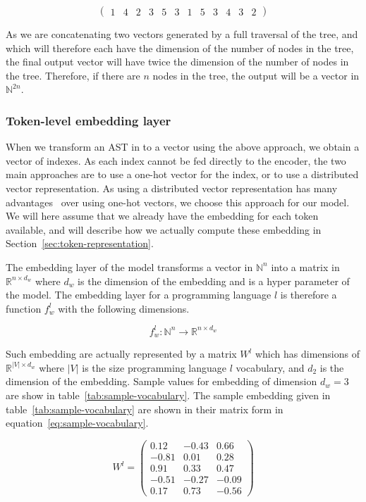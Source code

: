 \[ \begin{pmatrix}1 & 4 & 2 & 3 & 5 & 3 & 1 & 5 & 3 & 4 & 3 & 2\end{pmatrix} \]

As we are concatenating two vectors generated by a full traversal of the tree,
and which will therefore each have the dimension of the number of nodes in the
tree, the final output vector will have twice the dimension of the number of
nodes in the tree. Therefore, if there are $n$ nodes in the tree, the output
will be a vector in $\mathbb{N}^{2n}$.
%
\subsubsection{\label{sssec:token-embedding-layer} Token-level embedding layer}
When we transform an AST in to a vector using the above approach, we obtain a
vector of indexes. As each index cannot be fed directly to the encoder, the two
main approaches are to use a one-hot vector for the index, or to use a
distributed vector representation. As using a distributed vector representation
has many advantages~\cite{DBLP:journals/corr/MikolovSCCD13} over using one-hot
vectors, we choose this approach for our model. We will here assume that we
already have the embedding for each token available, and will describe how we
actually compute these embedding in Section~\ref{sec:token-representation}.

The embedding layer of the model transforms a vector in $\mathbb{N}^n$ into a
matrix in $\mathbb{R}^{n\times d_w}$ where $d_w$ is the dimension of the embedding
and is a hyper parameter of the model. The embedding layer for a programming
language $l$ is therefore a function $f_w^l$ with the following dimensions.

\begin{equation}
  f_w^l : \mathbb{N}^n \rightarrow \mathbb{R}^{n\times d_w}
\end{equation}

Such embedding are actually represented by a matrix $W^l$ which has dimensions
of $\mathbb{R}^{|V|\times d_w}$ where $|V|$ is the size programming language $l$
vocabulary, and $d_2$ is the dimension of the embedding.
Sample values for embedding of dimension $d_w = 3$ are show in
table~\ref{tab:sample-vocabulary}.
The sample embedding given in table~\ref{tab:sample-vocabulary} are
shown in their matrix form in equation~\ref{eq:sample-vocabulary}.

\begin{equation}
  \label{eq:sample-vocabulary}
  W^l =
  \begin{pmatrix}
    0.12 & -0.43 & 0.66\\
    -0.81 & 0.01 & 0.28\\
    0.91 & 0.33 & 0.47\\
    -0.51 & -0.27 & -0.09\\
    0.17 & 0.73 & -0.56
  \end{pmatrix}
\end{equation}

